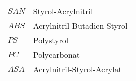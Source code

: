 \begin{table}[h]
    \begin{tabular}{@{}ll@{}}%
        \( SAN \) & Styrol-Acrylnitril\\
        \( ABS \) & Acrylnitril-Butadien-Styrol\\
        \( PS \) & Polystyrol\\
        \( PC \) & Polycarbonat\\
        \( ASA \) & Acrylnitril-Styrol-Acrylat\\
    \end{tabular}%
\label{tab:glossar}
\end{table}
